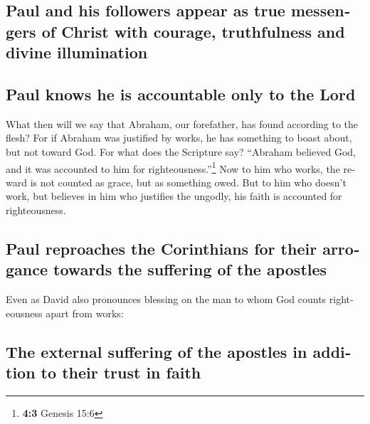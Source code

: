 \begin{paracol}{2}
\begin{otherlanguage}{english}
\hypertarget{paul-and-his-followers-appear-as-true-messengers-of-christ-with-courage-truthfulness-and-divine-illumination}{%
\subsection{Paul and his followers appear as true messengers of Christ
with courage, truthfulness and divine
illumination}\label{paul-and-his-followers-appear-as-true-messengers-of-christ-with-courage-truthfulness-and-divine-illumination}}

\hypertarget{paul-knows-he-is-accountable-only-to-the-lord}{%
\subsection{Paul knows he is accountable only to the
Lord}\label{paul-knows-he-is-accountable-only-to-the-lord}}

 What then will we say that Abraham, our forefather, has
found according to the flesh?  For if Abraham was
justified by works, he has something to boast about, but not toward God.
 For what does the Scripture say? ``Abraham believed God,
and it was accounted to him for righteousness.''\footnote{\textbf{4:3}
  Genesis 15:6}  Now to him who works, the reward is not
counted as grace, but as something owed.  But to him who
doesn't work, but believes in him who justifies the ungodly, his faith
is accounted for righteousness.

\hypertarget{paul-reproaches-the-corinthians-for-their-arrogance-towards-the-suffering-of-the-apostles}{%
\subsection{Paul reproaches the Corinthians for their arrogance towards
the suffering of the
apostles}\label{paul-reproaches-the-corinthians-for-their-arrogance-towards-the-suffering-of-the-apostles}}

 Even as David also pronounces blessing on the man to whom
God counts righteousness apart from works:

\hypertarget{the-external-suffering-of-the-apostles-in-addition-to-their-trust-in-faith}{%
\subsection{The external suffering of the apostles in addition to their
trust in
faith}\label{the-external-suffering-of-the-apostles-in-addition-to-their-trust-in-faith}}


\end{otherlanguage}
\end{paracol}
